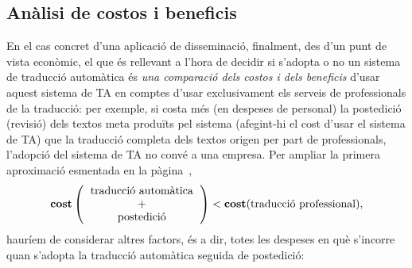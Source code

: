 \subsection{Anàlisi de costos i beneficis}
\label{ss:costdetall} En el cas concret d'una aplicació de
disseminació, finalment, des d'un punt de vista econòmic, el que és
rellevant a l'hora de decidir si s'adopta o no un sistema de traducció
automàtica és \emph{una comparació dels costos i dels beneficis}
d'usar aquest sistema de TA en comptes d'usar exclusivament els
serveis de professionals de la traducció: per exemple, si costa més
(en despeses de personal) la postedició (revisió) dels textos meta
produïts pel sistema (afegint-hi el cost d'usar el sistema de TA) que
la traducció completa dels textos origen per part de professionals,
l'adopció del sistema de TA no convé a una empresa. Per ampliar la
primera aproximació esmentada en la pàgina~\pageref{pg:cost},
$$\textbf{cost}\left(\mbox{\begin{tabular}{c}traducció automàtica\\ +\\
      postedició\end{tabular}}\right) <
\textbf{cost}(\mbox{traducció professional}),
$$
hauríem de considerar altres factors, és a dir, totes les despeses en
què s'incorre quan s'adopta la traducció automàtica seguida de
postedició:
